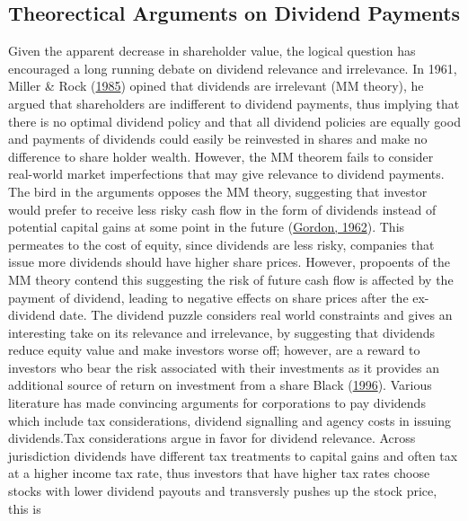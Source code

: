 \documentclass[10pt,preprint, authoryear]{elsarticle}
\numberwithin{equation}{section}
\numberwithin{figure}{section}
\numberwithin{table}{section}
\begin{document}
\hypertarget{theorectical-arguments-on-dividend-payments}{%
\subsection*{Theorectical Arguments on Dividend
Payments}\label{theorectical-arguments-on-dividend-payments}}

Given the apparent decrease in shareholder value, the logical question
has encouraged a long running debate on dividend relevance and
irrelevance. In 1961, Miller \& Rock
(\protect\hyperlink{ref-miller1985dividend}{1985}) opined that dividends
are irrelevant (MM theory), he argued that shareholders are indifferent
to dividend payments, thus implying that there is no optimal dividend
policy and that all dividend policies are equally good and payments of
dividends could easily be reinvested in shares and make no difference to
share holder wealth. However, the MM theorem fails to consider
real-world market imperfections that may give relevance to dividend
payments. The bird in the arguments opposes the MM theory, suggesting
that investor would prefer to receive less risky cash flow in the form
of dividends instead of potential capital gains at some point in the
future (\protect\hyperlink{ref-gordon1962}{Gordon, 1962}). This
permeates to the cost of equity, since dividends are less risky,
companies that issue more dividends should have higher share prices.
However, propoents of the MM theory contend this suggesting the risk of
future cash flow is affected by the payment of dividend, leading to
negative effects on share prices after the ex-dividend date. The
dividend puzzle considers real world constraints and gives an
interesting take on its relevance and irrelevance, by suggesting that
dividends reduce equity value and make investors worse off; however, are
a reward to investors who bear the risk associated with their
investments as it provides an additional source of return on investment
from a share Black (\protect\hyperlink{ref-black1996dividend}{1996}).
Various literature has made convincing arguments for corporations to pay
dividends which include tax considerations, dividend signalling and
agency costs in issuing dividends.Tax considerations argue in favor for
dividend relevance. Across jurisdiction dividends have different tax
treatments to capital gains and often tax at a higher income tax rate,
thus investors that have higher tax rates choose stocks with lower
dividend payouts and transversly pushes up the stock price, this is
\end{document}
